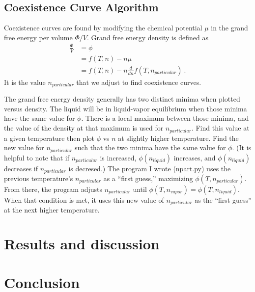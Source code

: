 \documentclass[letterpaper,twocolumn,amsmath,amssymb,prb]{revtex4-1}
\newcommand{\npart}{n_{particular}}
\newcommand{\nliq}{n_{liquid}}
\newcommand{\nvap}{n_{vapor}}
\begin{document}
\subsection{Coexistence Curve Algorithm}
Coexistence curves are found by modifying the chemical potential $\mu$
in the grand free energy per volume $\Phi/V$. Grand free energy
density is defined as
\begin{align}
  \frac{\Phi}{V} &= \phi \nonumber \\
                 &= f(T,n) - n\mu \nonumber \\
                 &= f(T,n) - n\frac{d}{dn}f(T,\npart)\ .
\end{align}
It is the value $\npart$ that we adjust to find coexistence curves.

The grand free energy density generally has two distinct minima when
plotted versus density. The liquid will be in liquid-vapor equilibrium
when those minima have the same value for $\phi$. There is a local
maximum between those minima, and the value of the density at that
maximum is used for $\npart$. Find this value at a given temperature
then plot $\phi$ vs $n$ at slightly higher temperature. Find the new
value for $\npart$ such that the two minima have the same value for
$\phi$. (It is helpful to note that if $\npart$ is increased,
$\phi(\nliq)$ increases, and $\phi(\nliq)$ decreases if $\npart$ is
decresed.) The program I wrote (npart.py) uses the previous
temperature's $\npart$ as a ``first guess,'' maximizing
$\phi(T,\npart)$. From there, the program adjusts $\npart$
until $\phi(T,\nvap) = \phi(T,\nliq)$. When that condition is met, it
uses this new value of $\npart$ as the ``first guess'' at the next
higher temperature.

\section{Results and discussion}



\section{Conclusion}


\end{document}
